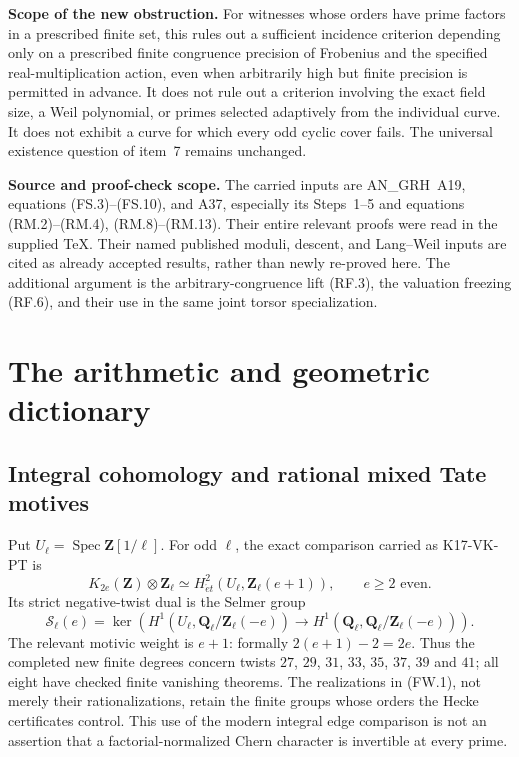 \documentclass[11pt,a4paper]{article}
\theoremstyle{definition}
\renewcommand{\paragraph}[1]{\par\smallskip\noindent\textbf{#1}\quad\ignorespaces}
\begin{document}
\paragraph{Scope of the new obstruction.}
For witnesses whose orders have prime factors in a prescribed
finite set, this rules out a sufficient incidence criterion
depending only on a prescribed finite congruence precision of
Frobenius and the specified real-multiplication action, even
when arbitrarily high but finite precision is permitted in
advance.  It does
not rule out a criterion involving the exact field size, a
Weil polynomial, or primes selected adaptively from the
individual curve.  It does not exhibit a curve for which every
odd cyclic cover fails.  The universal existence question of
item~7 remains unchanged.

\paragraph{Source and proof-check scope.}
The carried inputs are AN\_GRH~A19, equations (FS.3)--(FS.10),
and A37, especially its Steps~1--5 and equations
(RM.2)--(RM.4), (RM.8)--(RM.13).  Their entire relevant
proofs were read in the supplied TeX.  Their named published
moduli, descent, and Lang--Weil inputs are cited as already
accepted results, rather than newly re-proved here.  The
additional argument is the arbitrary-congruence lift (RF.3),
the valuation freezing (RF.6), and their use in the same joint
torsor specialization.



\section{The arithmetic and geometric dictionary}
\label{sec:framework}

\subsection{Integral cohomology and rational mixed Tate motives}

Put $U_\ell=\operatorname{Spec}\mathbf Z[1/\ell]$.
For odd $\ell$, the exact comparison carried as K17-VK-PT is
\[
 K_{2e}(\mathbf Z)\otimes\mathbf Z_\ell
       \simeq H^2_{\acute et}(U_\ell,\mathbf Z_\ell(e+1)),
 \qquad e\ge2\text{ even}.
 \tag{FW.1}
\]
Its strict negative-twist dual is the Selmer group
\[
 \mathcal S_\ell(e)=\ker\left(
 H^1(U_\ell,\mathbf Q_\ell/\mathbf Z_\ell(-e))
 \longrightarrow
 H^1(\mathbf Q_\ell,\mathbf Q_\ell/\mathbf Z_\ell(-e))\right).
 \tag{FW.2}
\]
The relevant motivic weight is $e+1$: formally $2(e+1)-2=2e$.
Thus the completed new finite degrees concern twists $27$, $29$, $31$,
$33$, $35$, $37$, $39$ and $41$; all eight have checked finite vanishing theorems.
The realizations in (FW.1), not merely their rationalizations,
retain the finite groups whose orders the Hecke certificates
control. This use of the modern integral edge comparison is
not an assertion that a factorial-normalized Chern character
is invertible at every prime.
\end{document}

